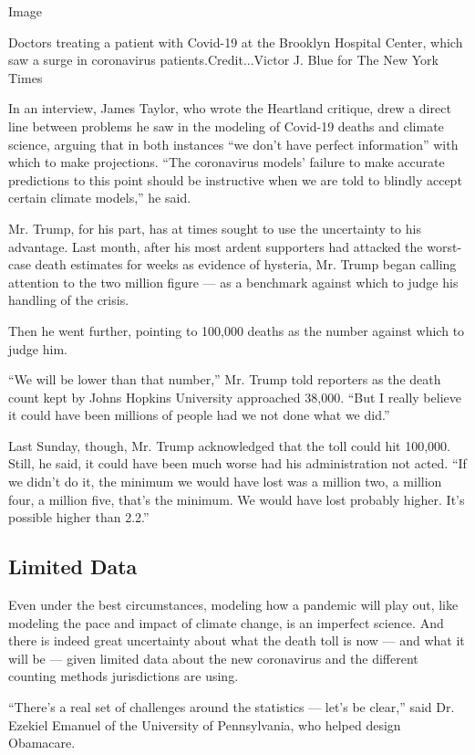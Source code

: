 Image

Doctors treating a patient with Covid-19 at the Brooklyn Hospital
Center, which saw a surge in coronavirus patients.Credit...Victor J.
Blue for The New York Times

In an interview, James Taylor, who wrote the Heartland critique, drew a
direct line between problems he saw in the modeling of Covid-19 deaths
and climate science, arguing that in both instances ``we don't have
perfect information'' with which to make projections. ``The coronavirus
models' failure to make accurate predictions to this point should be
instructive when we are told to blindly accept certain climate models,''
he said.

Mr. Trump, for his part, has at times sought to use the uncertainty to
his advantage. Last month, after his most ardent supporters had attacked
the worst-case death estimates for weeks as evidence of hysteria, Mr.
Trump began calling attention to the two million figure --- as a
benchmark against which to judge his handling of the crisis.

Then he went further, pointing to 100,000 deaths as the number against
which to judge him.

``We will be lower than that number,'' Mr. Trump told reporters as the
death count kept by Johns Hopkins University approached 38,000. ``But I
really believe it could have been millions of people had we not done
what we did.''

Last Sunday, though, Mr. Trump acknowledged that the toll could hit
100,000. Still, he said, it could have been much worse had his
administration not acted. ``If we didn't do it, the minimum we would
have lost was a million two, a million four, a million five, that's the
minimum. We would have lost probably higher. It's possible higher than
2.2.''

\hypertarget{limited-data}{%
\subsection{Limited Data}\label{limited-data}}

Even under the best circumstances, modeling how a pandemic will play
out, like modeling the pace and impact of climate change, is an
imperfect science. And there is indeed great uncertainty about what the
death toll is now --- and what it will be --- given limited data about
the new coronavirus and the different counting methods jurisdictions are
using.

``There's a real set of challenges around the statistics --- let's be
clear,'' said Dr. Ezekiel Emanuel of the University of Pennsylvania, who
helped design Obamacare.

